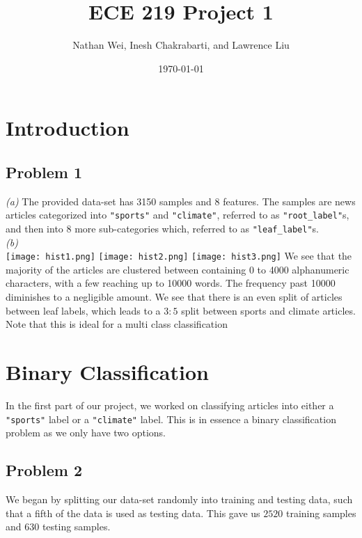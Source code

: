 \documentclass[11pt]{article}
\title{ECE 219 Project 1} %
\author{Nathan Wei, Inesh Chakrabarti, and Lawrence Liu} %
\date{\today}
\begin{document}
\maketitle
\begin{multicols}{2}
\section*{Introduction}
\subsection*{Problem 1}
\textit{(a)} The provided data-set has 3150 samples and 8 features. 
The samples are news articles categorized into \texttt{"sports"} and \texttt{"climate"}, 
referred to as \texttt{"root\_label"}s, and then into 8 more sub-categories which, referred to as \texttt{"leaf\_label"}s. \\
\textit{(b)} \\
\texttt{[image: hist1.png]}
\texttt{[image: hist2.png]}
\texttt{[image: hist3.png]}
\newline We see that the majority of the articles are clustered between containing 0 to 4000 alphanumeric characters, with a few reaching up to 10000 words. The frequency past 10000 diminishes to a negligible amount. We see that there is an even split of articles between leaf labels, which leads to a $3:5$ split between sports and climate articles. Note that this is ideal for a multi class classification  
\section*{Binary Classification}
In the first part of our project, we worked on classifying articles into either a \texttt{"sports"} label or a \texttt{"climate"} label. This is in essence a binary classification problem as we only have two options. 
\subsection*{Problem 2}
We began by splitting our data-set randomly into training and testing data, such that a fifth of the data is used as testing data. This gave us $2520$ training samples and $630$ testing samples. 

\end{multicols}
\end{document}

